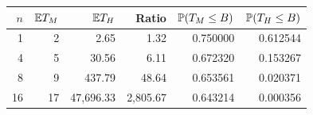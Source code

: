 \begin{tabular}{rrrrrr}
\toprule
$n$ & $\mathbb{E} T_M$ & $\mathbb{E} T_H$ & Ratio & $\mathbb{P}(T_M\leq B)$ & $\mathbb{P}(T_H\leq B)$ \\
\midrule
1 & 2 & 2.65 & 1.32 & 0.750000 & 0.612544 \\
4 & 5 & 30.56 & 6.11 & 0.672320 & 0.153267 \\
8 & 9 & 437.79 & 48.64 & 0.653561 & 0.020371 \\
16 & 17 & 47,696.33 & 2,805.67 & 0.643214 & 0.000356 \\
\bottomrule
\end{tabular}
